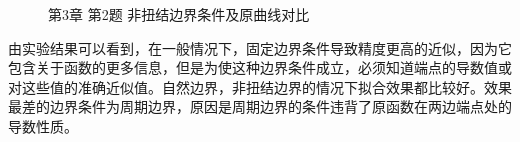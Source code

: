 \documentclass[12pt]{ctexart}
\begin{document}
	\begin{figure}[htbp]
		\centering
		 \quad
		\caption{第3章 第2题 非扭结边界条件及原曲线对比}
	\end{figure}
	
	由实验结果可以看到，在一般情况下，固定边界条件导致精度更高的近似，因为它包含关于函数的更多信息，但是为使这种边界条件成立，必须知道端点的导数值或对这些值的准确近似值。自然边界，非扭结边界的情况下拟合效果都比较好。效果最差的边界条件为周期边界，原因是周期边界的条件违背了原函数在两边端点处的导数性质。
	
\end{document}
